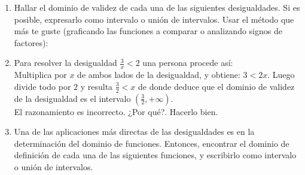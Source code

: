 \documentclass[12pt]{article}
\theoremstyle{definition}
\begin{document}
\begin{enumerate}
\begin{enumerate}
\end{enumerate}
\item  Hallar el dominio de validez de cada una de las siguientes desigualdades. Si es posible, expresarlo como intervalo o unión de intervalos. Usar el método que más te guste (graficando las funciones a comparar o analizando signos de factores):
\begin{enumerate}
\end{enumerate}
\item Para resolver la desigualdad $\frac{3}{x} < 2$ una persona procede así:\\
Multiplica por $x$ de ambos lados de la desigualdad, y obtiene: $ 3 < 2x$. Luego divide todo por $2$ y resulta $ \frac{3}{2} < x$ de donde deduce que el dominio de validez de la desigualdad es el intervalo $(\frac{3}{2},+\infty)$.  \\
El razonamiento es incorrecto. ¿Por qué?. Hacerlo bien.

\item Una de las aplicaciones más directas de las desigualdades es en la determinación del dominio de funciones. Entonces, encontrar el dominio de definición de cada una de las siguientes funciones, y escribirlo como intervalo o unión de intervalos.
\begin{enumerate}
\end{enumerate}
\end{enumerate}
\end{document}
